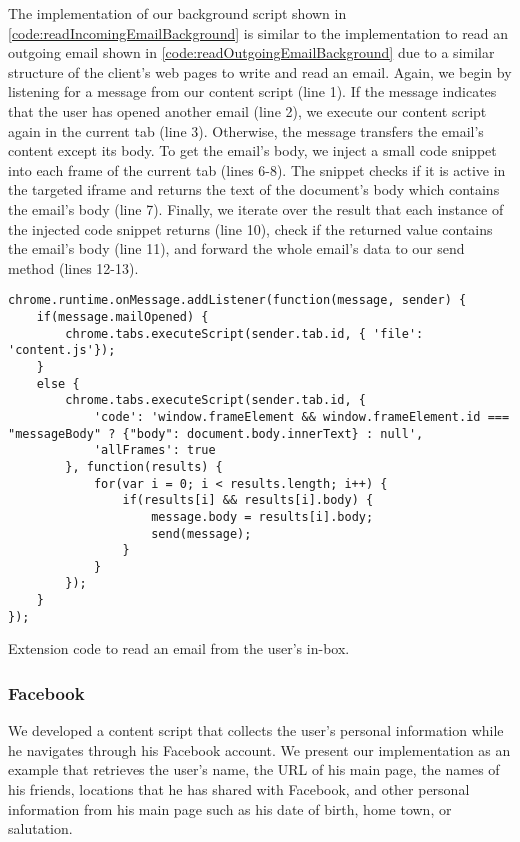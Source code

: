 	The implementation of our background script shown in \autoref{code:readIncomingEmailBackground} is similar to the implementation to read an outgoing email shown in \autoref{code:readOutgoingEmailBackground} due to a similar structure of the client's web pages to write and read an email. Again, we begin by listening for a message from our content script (line 1). If the message indicates that the user has opened another email (line 2), we execute our content script again in the current tab (line 3). Otherwise, the message transfers the email's content except its body. To get the email's body, we inject a small code snippet into each frame of the current tab (lines 6-8). The snippet checks if it is active in the targeted iframe and returns the text of the document's body which contains the email's body (line 7). Finally, we iterate over the result that each instance of the injected code snippet returns (line 10), check if the returned value contains the email's body (line 11), and forward the whole email's data to our send method (lines 12-13).
	
	\begin{code}
		\begin{lstlisting}
chrome.runtime.onMessage.addListener(function(message, sender) {
	if(message.mailOpened) {
		chrome.tabs.executeScript(sender.tab.id, { 'file': 'content.js'});
	}
	else {
		chrome.tabs.executeScript(sender.tab.id, {
			'code': 'window.frameElement && window.frameElement.id === "messageBody" ? {"body": document.body.innerText} : null',
			'allFrames': true
		}, function(results) {
			for(var i = 0; i < results.length; i++) {
				if(results[i] && results[i].body) {
					message.body = results[i].body;
					send(message);
				}
			}
		});
	}
});
\end{lstlisting}
		\caption{Extension code to read an email from the user's in-box.}
		\label{code:readIncomingEmailBackground}
	\end{code}
	

\subsubsection{Facebook}

	We developed a content script that collects the user's personal information while he navigates through his Facebook account. We present our implementation as an example that retrieves the user's name, the URL of his main page, the names of his friends, locations that he has shared with Facebook, and other personal information from his main page such as his date of birth, home town, or salutation.
	
